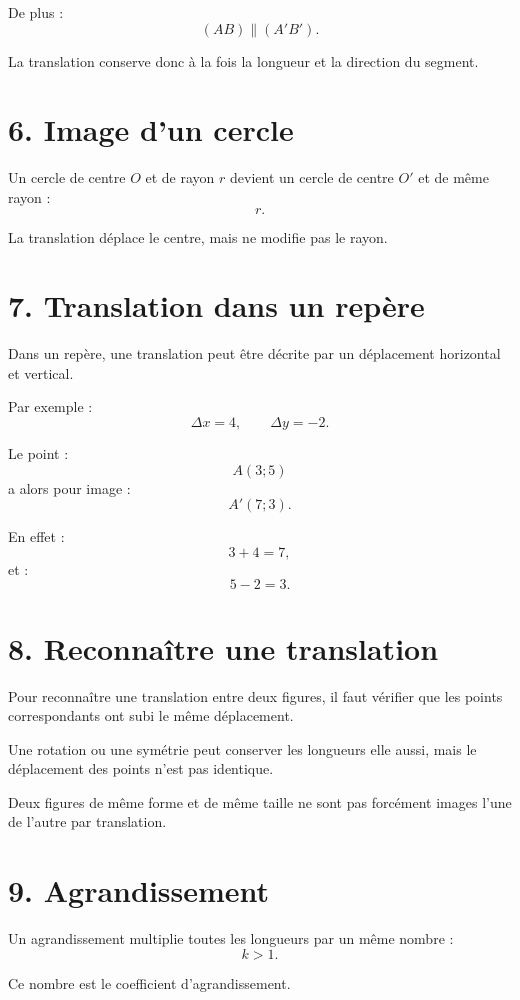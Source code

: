 De plus :
\[
(AB)\parallel(A'B').
\]

La translation conserve donc à la fois la longueur et la direction du segment.

\section{6. Image d'un cercle}

Un cercle de centre $O$ et de rayon $r$ devient un cercle de centre $O'$ et de même rayon :
\[
r.
\]

La translation déplace le centre, mais ne modifie pas le rayon.

\section{7. Translation dans un repère}

Dans un repère, une translation peut être décrite par un déplacement horizontal et vertical.

Par exemple :
\[
\Delta x=4,
\qquad
\Delta y=-2.
\]

Le point :
\[
A(3;5)
\]
a alors pour image :
\[
A'(7;3).
\]

En effet :
\[
3+4=7,
\]
et :
\[
5-2=3.
\]

\section{8. Reconnaître une translation}

Pour reconnaître une translation entre deux figures, il faut vérifier que les points correspondants ont subi le même déplacement.

Une rotation ou une symétrie peut conserver les longueurs elle aussi, mais le déplacement des points n'est pas identique.

\begin{attention}
Deux figures de même forme et de même taille ne sont pas forcément images l'une de l'autre par translation.
\end{attention}

\section{9. Agrandissement}

Un agrandissement multiplie toutes les longueurs par un même nombre :
\[
k>1.
\]

Ce nombre est le coefficient d'agrandissement.


